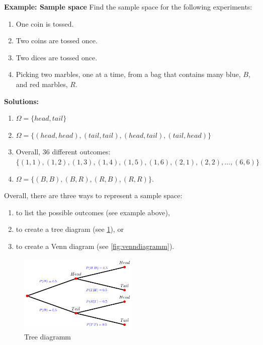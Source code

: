 \documentclass[
  12pt,
  oneside]{book}
\providecommand{\tightlist}{%
  \setlength{\itemsep}{0pt}\setlength{\parskip}{0pt}}
\theoremstyle{definition}
\theoremstyle{definition}
\theoremstyle{definition}
\theoremstyle{definition}
\theoremstyle{remark}
\begin{document}
\textbf{Example: Sample space}
Find the sample space for the following experiments:

\begin{enumerate}
\def\labelenumi{\alph{enumi})}
\tightlist
\item
  One coin is tossed.
\item
  Two coins are tossed once.
\item
  Two dices are tossed once.
\item
  Picking two marbles, one at a time, from a bag that contains many blue, \(B\), and red marbles, \(R\).
\end{enumerate}

\textbf{Solutions:}

\begin{enumerate}
\def\labelenumi{\alph{enumi})}
\tightlist
\item
  \(\Omega = \{head, tail\}\)
\item
  \(\Omega = \{(head, head), (tail, tail),(head, tail),(tail, head)\}\)
\item
  Overall, 36 different outcomes:
  \(\{  (1,1),(1,2),(1,3),(1,4),(1,5),(1,6),(2,1),(2,2),\dots,(6,6)  \}\)
\item
  \(\Omega = \{(B,B), (B,R), (R,B), (R,R)\}\).
\end{enumerate}

Overall, there are three ways to represent a sample space:

\begin{enumerate}
\def\labelenumi{\arabic{enumi}.}
\tightlist
\item
  to list the possible outcomes (see example above),
\item
  to create a tree diagram (see \ref{fig:decisiontree}), or
\item
  to create a Venn diagram (see \ref{fig:venndiagramm}).
\end{enumerate}

\begin{figure}
\centering
\includegraphics[width=0.5\textwidth,height=\textheight]{fig/treedia.png}
\caption{\label{fig:decisiontree} Tree diagramm}
\end{figure}
\end{document}
